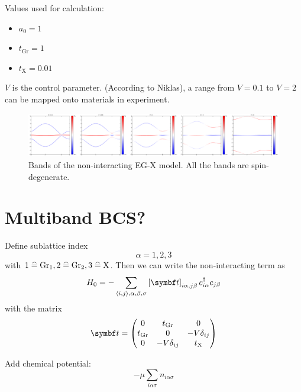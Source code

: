 \documentclass[../notes.tex]{subfiles}
\begin{document}
Values used for calculation:
\begin{itemize}
	\item \(a_0 = 1\)
	\item \(t_{\mathrm{Gr}} = 1\)
	\item \(t_{\mathrm{X}} = 0.01\)
\end{itemize}
\(V\) is the control parameter.
(According to Niklas), a range from \(V = 0.1\) to \(V = 2\) can be mapped onto materials in experiment.

\begin{figure}[t]
	\centering
	\includegraphics[width=\textwidth]{images/EG_X bands_tGr_1_tX_0.01}
	\caption{Bands of the non-interacting EG-X model. All the bands are spin-degenerate.}
	\label{fig:EG-X model non-interacting bands}
\end{figure}

\section{Multiband BCS?}
	
Define sublattice index
\begin{equation}
	\alpha = 1, 2, 3
\end{equation}
with \(1 \mathrel{\widehat{=}} \mathrm{Gr}_1, 2 \mathrel{\widehat{=}} \mathrm{Gr}_2, 3 \mathrel{\widehat{=}} \mathrm{X}\).
Then we can write the non-interacting term as
\begin{equation}
	H_0 = - \sum_{\langle i, j \rangle, \alpha, \beta, \sigma} \left[\mat{t} \right]_{i\alpha,j\beta} c_{i\alpha}^{\dagger} c_{j\beta}
\end{equation}
with the matrix
\begin{equation}
	\mat{t} = \begin{pmatrix}
		0 & t_{\mathrm{Gr}} & 0 \\
		t_{\mathrm{Gr}} & 0 & -V \delta_{ij} \\
		0 & -V \delta_{ij} & t_{\mathrm{X}} \\
	\end{pmatrix}
\end{equation}

Add chemical potential:
\begin{equation}
	-\mu \sum_{i \alpha \sigma} n_{i \alpha \sigma}
\end{equation}
\end{document}
